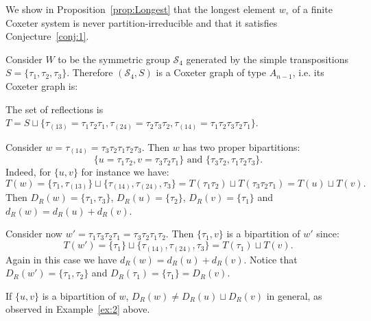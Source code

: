 \documentclass[Unicode]{cedram-alco}
\theoremstyle{definition}
\begin{document}
We show in Proposition~\ref{prop:Longest} that the longest element $w_\circ$ of a finite Coxeter system is never partition-irreducible and that it satisfies Conjecture~\ref{conj:1}. 


\begin{ex}\label{ex:2} Consider $W$ to be the symmetric group $\mathcal S_4$  generated by the simple transpositions $S=\{\tau_1,\tau_2,\tau_3\}$. Therefore $(\mathcal S_4,S)$ is a Coxeter graph of type $A_{n-1}$, i.e. its  Coxeter graph is:
\begin{center}
\end{center}
The set of reflections is $T=S\sqcup\{\tau_{(13)}=\tau_1\tau_2\tau_1,\tau_{(24)}=\tau_2\tau_3\tau_2,\tau_{(14)}=\tau_1\tau_2\tau_3\tau_2\tau_1\}$. 

Consider $w=\tau_{(14)}=\tau_3\tau_2\tau_1\tau_2\tau_3$. Then $w$ has two proper bipartitions:  
$$
\{u=\tau_1\tau_2,v=\tau_3\tau_2\tau_1\}\textrm{ and }\{\tau_3\tau_2,\tau_1\tau_2\tau_3\}.
$$ 
Indeed, for $\{u,v\}$ for instance we have:
$$
T(w)=\{\tau_1, \tau_{(13)}\}\sqcup\{\tau_{(14)},\tau_{(24)},\tau_{3}\}=T(\tau_1\tau_2)\sqcup T(\tau_3\tau_2\tau_1)=T(u)\sqcup T(v).
$$
Then $D_R(w)=\{\tau_1,\tau_3\}$, $D_R(u)=\{\tau_2\}$, $D_R(v)=\{\tau_1\}$ and $d_R(w)=d_R(u)+d_R(v)$.

Consider now $w'=\tau_1\tau_3\tau_2\tau_1=\tau_3\tau_2\tau_1\tau_2$. Then $\{\tau_1,v\}$ is a bipartition of $w'$ since:
$$
T(w')=\{\tau_1\}\sqcup\{\tau_{(14)},\tau_{(24)},\tau_{3}\}=T(\tau_1)\sqcup T(v).
$$
Again in this case we have $d_R(w)=d_R(u)+d_R(v)$. Notice that $D_R(w')=\{\tau_1,\tau_2\}$ and $D_R(\tau_1)=\{\tau_1\}=D_R(v)$.
\end{ex}

\begin{remark} If $\{u,v\}$ is a bipartition of $w$,  $D_R(w)\not = D_R(u)\sqcup D_R(v)$ in general, as observed in Example~\ref{ex:2} above. 
\end{remark}
\end{document}
